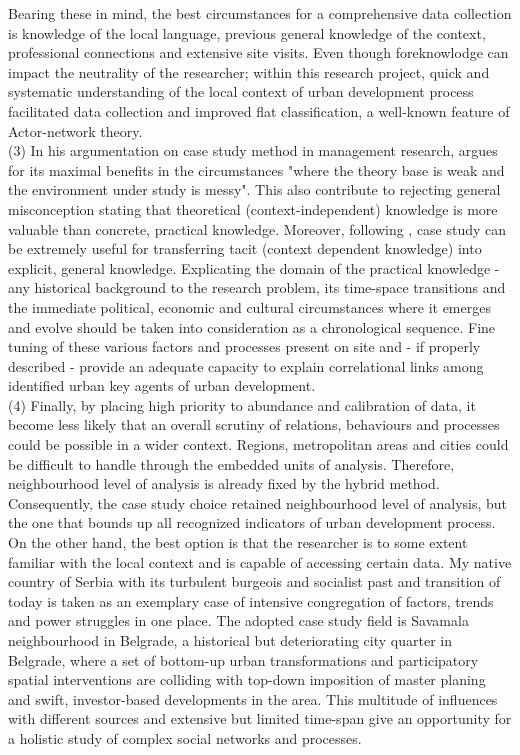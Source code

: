 \documentclass[11pt]{report}
\begin{document}
Bearing these in mind, the best circumstances for a comprehensive data collection is knowledge of the local language, previous general knowledge of the context, professional connections and extensive site visits. Even though foreknowlodge can impact the neutrality of the researcher; within this research project, quick and systematic understanding of the local context of urban development process facilitated data collection and improved flat classification, a well-known feature of Actor-network theory. 
\\
(3) In his argumentation on case study method in management research,  argues for its maximal benefits in the circumstances "where the theory base is weak and the environment under study is messy". This also contribute to rejecting general misconception stating that theoretical (context-independent) knowledge is more valuable than concrete, practical knowledge. Moreover, following , case study can be extremely useful for transferring tacit (context dependent knowledge) into explicit, general knowledge. Explicating the domain of the practical knowledge -
any historical background to the research problem, its time-space transitions and the immediate political, economic and cultural circumstances where it emerges and evolve should be taken into consideration as a chronological sequence. Fine tuning of these various factors and processes present on site and  - if properly described - provide an adequate capacity to explain correlational links among identified urban key agents of urban development.
\\
(4) Finally, by placing high priority to abundance and calibration of data, it become less likely that an overall scrutiny of relations, behaviours and processes could be possible in a wider context. Regions, metropolitan areas and cities could be difficult to handle through the embedded units of analysis. Therefore, neighbourhood level of analysis is already fixed by the hybrid method.
\\
Consequently, the case study choice retained neighbourhood level of analysis, but the one that bounds up all recognized indicators of urban development process. On the other hand, the best option is that the  researcher  is  to  some  extent  familiar  with  the  local  context and  is capable of accessing certain data.  My native country of Serbia with its turbulent  burgeois and socialist past and transition of today is taken as an exemplary case of intensive congregation of factors, trends and power struggles in one place. The adopted case study field is Savamala neighbourhood in Belgrade, a historical but deteriorating city quarter in Belgrade, where a set of bottom-up urban transformations and participatory spatial interventions are colliding with top-down imposition of master planing and swift, investor-based developments in the area. This multitude of influences with different sources and extensive but limited time-span give an opportunity for a holistic study of complex social networks and processes. 
\end{document}
